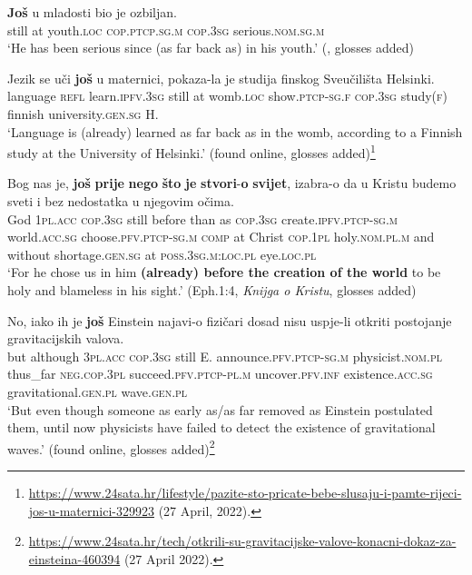 \begin{exe}
	\ex\label{exappendixBCMSTimeScalar5}
	\gll \textbf{Još} u mladosti bio je ozbiljan.\\
	still at youth.\textsc{loc} \textsc{cop}.\textsc{ptcp}.\textsc{sg}.\textsc{m} \textsc{cop}.3\textsc{sg} serious.\textsc{nom}.\textsc{sg}.\textsc{m}\\
	\glt \lq He has been serious since (as far back as) in his youth.\rq{ }(\cite[s.v. \textit{još}]{HJP}, glosses added)
	
	
	\ex\label{exappendixBCMSTimeScalar6}
	\gll Jezik se uči \textbf{još} u maternici, pokaza-la je studija finskog Sveučilišta Helsinki.\\
	language \textsc{refl} learn.\textsc{ipfv}.3\textsc{sg} still at womb.\textsc{loc} show.\textsc{ptcp}-\textsc{sg}.\textsc{f} \textsc{cop}.3\textsc{sg} study(\textsc{f}) finnish university.\textsc{gen}.\textsc{sg} H.\\
	\glt \lq Language is (already) learned as far back as in the womb, according to a Finnish study at the University of Helsinki.\rq{ }(found online, glosses added)\footnote{\url{https://www.24sata.hr/lifestyle/pazite-sto-pricate-bebe-slusaju-i-pamte-rijeci-jos-u-maternici-329923} (27 April, 2022).}
	
	\pagebreak
	\ex\label{exappendixBCMSTimeScalar7}
	\gll
	Bog nas je, \textbf{još} \textbf{prije} \textbf{nego} \textbf{što} \textbf{je} \textbf{stvori}-\textbf{o} \textbf{svijet}, izabra-o da u Kristu budemo sveti i bez nedostatka u njegovim očima.\\
	God 1\textsc{pl}.\textsc{acc} \textsc{cop}.3\textsc{sg} still before than as \textsc{cop}.3\textsc{sg} create.\textsc{ipfv}.\textsc{ptcp}-\textsc{sg}.\textsc{m} world.\textsc{acc}.\textsc{sg} choose.\textsc{pfv}.\textsc{ptcp}-\textsc{sg}.\textsc{m} \textsc{comp} at Christ \textsc{cop}.1\textsc{pl} holy.\textsc{nom}.\textsc{pl}.\textsc{m} and without shortage.\textsc{gen}.\textsc{sg} at \textsc{poss}.3\textsc{sg}.\textsc{m}:\textsc{loc}.\textsc{pl} eye.\textsc{loc}.\textsc{pl}\\
	\glt \lq For he chose us in him \textbf{(already) before the creation of the world} to be holy and blameless in his sight.\rq{ }(Eph.1:4, \textit{Knijga o Kristu}, glosses added)
	
	\ex\label{exappendixBCMSTimeScalar8}
		\gll No, iako ih je \textbf{još} Einstein najavi-o fizičari dosad nisu uspje-li otkriti postojanje gravitacijskih valova. \\
but although 3\textsc{pl}.\textsc{acc} \textsc{cop}.3\textsc{sg} still E. announce.\textsc{pfv}.\textsc{ptcp}-\textsc{sg}.\textsc{m} physicist.\textsc{nom}.\textsc{pl} thus\_far \textsc{neg}.\textsc{cop}.3\textsc{pl} succeed.\textsc{pfv}.\textsc{ptcp}-\textsc{pl}.\textsc{m} uncover.\textsc{pfv}.\textsc{inf} existence.\textsc{acc}.\textsc{sg} gravitational.\textsc{gen}.\textsc{pl} wave.\textsc{gen}.\textsc{pl}\\
\glt \lq But even though someone as early as/as far removed as Einstein postulated them, until now physicists have failed to detect the existence of gravitational waves.' (found online, glosses added)\footnote{\url{https://www.24sata.hr/tech/otkrili-su-gravitacijske-valove-konacni-dokaz-za-einsteina-460394} (27 April 2022).} 



\end{exe}
